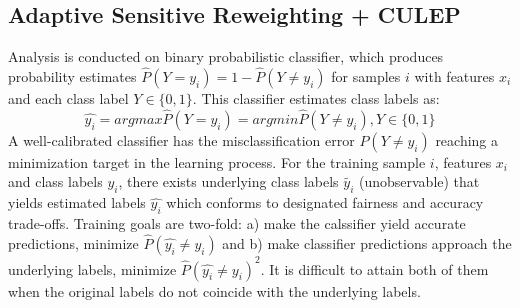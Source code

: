 \documentclass[runningheads]{llncs}
\begin{document}
\subsection{Adaptive Sensitive Reweighting + CULEP}
Analysis is conducted on binary probabilistic classifier, which produces probability estimates $\hat{P}(Y=y_i) = 1 - \hat{P}(Y \ne y_i)$ for samples $i$ with features $x_i$ and each class label $Y \in \{0,1\}$. This classifier estimates class labels as:
\begin{equation}
\hat{y_i} = argmax\hat{P}(Y=y_i) = argmin\hat{P}(Y \ne y_i) , Y \in \{0,1\}
\end{equation}
A well-calibrated classifier has the misclassification error $P(Y \ne y_i)$ reaching a minimization target in the learning process. For the training sample $i$, features $x_i$ and class labels $y_i$, there exists underlying class labels $\tilde{y_i}$ (unobservable) that yields estimated labels $\hat{y_i}$ which conforms to designated fairness and accuracy trade-offs. Training goals are two-fold: a) make the calssifier yield accurate predictions, minimize $\hat{P}(\hat{y_i} \ne y_i)$ and b) make classifier predictions approach the underlying labels, minimize ${\hat{P}(\hat{y_i} \ne y_i)}^2$. It is difficult to attain both of them when the original labels do not coincide with the underlying labels. 
\end{document}
